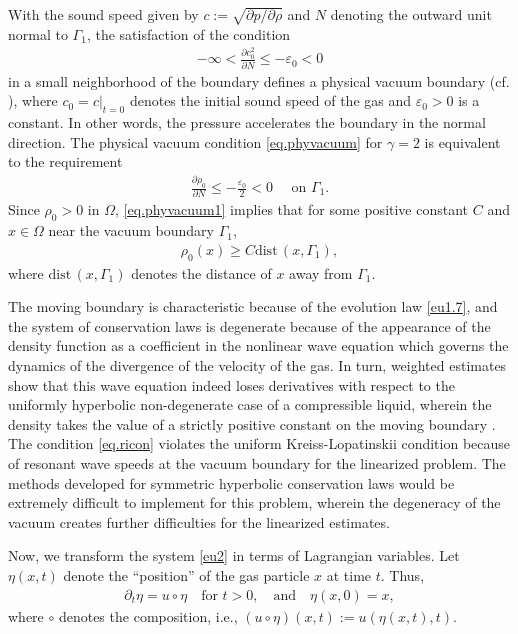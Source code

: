 \documentclass[12pt,twoside,reqno]{amsart}
\numberwithin{equation}{section}
\theoremstyle{definition}
\theoremstyle{remark}
\begin{document}
With the sound speed given by $c:=\sqrt{{\partial} p/{\partial}\rho}$ and $N$ denoting the outward unit normal to ${\Gamma_1}$, the satisfaction of the condition
\begin{align}\label{eq.phyvacuum}
  -\infty<\frac{{\partial} c_0^2}{{\partial} N}{\leqslant} -{\varepsilon}_0<0
\end{align}
in a small neighborhood of the boundary defines a physical vacuum boundary (cf. \cite{Liu00}), where $c_0=c|_{t=0}$ denotes the initial sound speed of the gas and ${\varepsilon}_0>0$ is a constant. In other words, the pressure accelerates the boundary in the normal direction. The physical vacuum condition \eqref{eq.phyvacuum} for $\gamma=2$ is equivalent to the requirement
\begin{align}\label{eq.phyvacuum1}
  \frac{{\partial}{\rho_0}  }{{\partial} N}{\leqslant} -\frac{{\varepsilon}_0}{2}< 0 \quad \text{ on } {\Gamma_1}.
\end{align}
Since ${\rho_0}>0$ in $\Omega$, \eqref{eq.phyvacuum1} implies that for some positive constant $C$ and $x\in\Omega$ near the vacuum boundary ${\Gamma_1}$,
\begin{align}\label{eq.ricon}
  {\rho_0}   (x){\geqslant} C{\mathrm{dist}\,}(x,{\Gamma_1}),
\end{align}
where ${\mathrm{dist}\,}(x,{\Gamma_1})$ denotes the distance of $x$ away from $\Gamma_1$.

The moving boundary is characteristic because of the evolution law \eqref{eu1.7}, and the system of conservation laws is degenerate because of the appearance of the density function as a coefficient in the nonlinear wave equation which governs the dynamics of the divergence of the velocity of the gas. In turn, weighted estimates show that this wave equation indeed loses derivatives with respect to the uniformly hyperbolic non-degenerate case of a compressible liquid, wherein the density takes the value of a strictly positive constant on the moving boundary \cite{CF76}. The condition \eqref{eq.ricon} violates the uniform Kreiss-Lopatinskii condition \cite{Kreiss} because of resonant wave speeds at the vacuum boundary for the linearized problem. The methods developed for symmetric hyperbolic conservation laws would be extremely difficult to implement for this problem, wherein the degeneracy of the vacuum creates further difficulties for the linearized estimates.

Now, we transform the system \eqref{eu2} in terms of Lagrangian variables. Let $\eta(x,t)$ denote the ``position'' of the gas particle $x$ at time $t$. Thus,
\begin{align}\label{eq.eta}
  {\partial}_t\eta=u\circ \eta \quad \text{for } t>0, \quad \text{and} \quad \eta(x,0)=x,
\end{align}
where $\circ$ denotes the composition, i.e., $(u\circ\eta)(x,t):=u(\eta(x,t),t)$.
\end{document}
